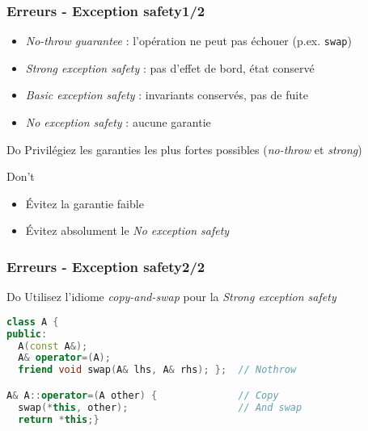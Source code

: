 \documentclass[C++.tex]{subfiles}
\begin{document}
\begin{frame}
	\frametitle{Erreurs - Exception safety\titlehfill{}1/2}
	\begin{itemize}
		\item \textit{No-throw guarantee} : l'opération ne peut pas échouer (p.ex. \lstinline|swap|)


		\item \textit{Strong exception safety} : pas d'effet de bord, état conservé


		\item \textit{Basic exception safety} : invariants conservés, pas de fuite


		\item \textit{No exception safety} : aucune garantie
	\end{itemize}

	\begin{exampleblock}{Do}
		Privilégiez les garanties les plus fortes possibles (\textit{no-throw} et \textit{strong})
	\end{exampleblock}

	\begin{alertblock}{Don't}
		\begin{itemize}
			\item Évitez la garantie faible
			\item Évitez absolument le \textit{No exception safety}
		\end{itemize}
	\end{alertblock}
\end{frame}

\begin{frame}[fragile]
	\frametitle{Erreurs - Exception safety\titlehfill{}2/2}
	\begin{exampleblock}{Do}
		Utilisez l'idiome \og \textit{copy-and-swap}\fg{} pour la \textit{Strong exception safety}
	\end{exampleblock}


	\begin{lstlisting}[language=C++]
class A {
public:
  A(const A&);
  A& operator=(A);
  friend void swap(A& lhs, A& rhs); };  // Nothrow

A& A::operator=(A other) {              // Copy
  swap(*this, other);                   // And swap
  return *this;}\end{lstlisting}
\end{frame}
\end{document}
